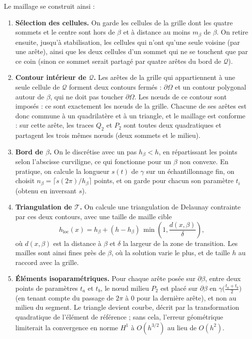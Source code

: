 \documentclass[11pt,a4paper]{article}
\begin{document}
Le maillage se construit ainsi :
\begin{enumerate}
  \item \textbf{Sélection des cellules.} On garde les cellules de la grille
        dont les quatre sommets et le centre sont hors de $\beta$ et à
        distance au moins $m_\beta$ de $\beta$. On retire ensuite, jusqu'à
        stabilisation, les cellules qui n'ont qu'une seule voisine (par une
        arête), ainsi que les deux cellules d'un sommet qui ne se touchent
        que par ce coin (sinon ce sommet serait partagé par quatre arêtes du
        bord de $\mathcal{Q}$).
  \item \textbf{Contour intérieur de $\mathcal{Q}$.} Les arêtes de la grille
        qui appartiennent à une seule cellule de $\mathcal{Q}$ forment deux contours fermés :
        $\partial\Omega$ et un contour polygonal autour de $\beta$, qui ne doit
        pas toucher $\partial\Omega$. Les nœuds de ce contour sont imposés :
        ce sont exactement les nœuds de la grille. Chacune de ses arêtes est
        donc commune à un quadrilatère et à un triangle, et le maillage est
        conforme : sur cette arête, les traces $Q_2$ et $P_2$ sont toutes deux
        quadratiques et partagent les trois mêmes nœuds (deux sommets et le
        milieu).
  \item \textbf{Bord de $\beta$.} On le discrétise avec un pas $h_\beta < h$,
        en répartissant les points selon l'abscisse curviligne, ce qui
        fonctionne pour un $\beta$ non convexe. En pratique, on calcule
        la longueur $s(t)$ de $\gamma$ sur un échantillonnage fin, on
        choisit $n_\beta = \lceil s(2\pi)/h_\beta \rceil$ points, et on
        garde pour chacun son paramètre $t_i$ (obtenu en inversant $s$).
  \item \textbf{Triangulation de $\mathcal{T}$.} On calcule une triangulation
        de Delaunay contrainte par ces deux contours, avec une taille de
        maille cible
        \[
        h_{\mathrm{loc}}(x) = h_\beta + (h - h_\beta)\,\min\!\left(1, \frac{d(x,\beta)}{\delta}\right),
        \]
        où $d(x,\beta)$ est la distance à $\beta$ et $\delta$ la largeur de
        la zone de transition. Les mailles sont ainsi fines près de $\beta$,
        où la solution varie le plus, et de taille $h$ au raccord avec la
        grille.
  \item \textbf{Éléments isoparamétriques.} Pour chaque arête posée sur
        $\partial\beta$, entre deux points de paramètres $t_a$ et $t_b$, le
        nœud milieu $P_2$ est placé sur $\partial\beta$ en
        $\gamma\big(\tfrac{t_a + t_b}{2}\big)$ (en tenant compte du passage
        de $2\pi$ à $0$ pour la dernière arête), et non au milieu du
        segment. Le triangle devient courbe, décrit par la
        transformation quadratique de l'élément de référence ; sans cela,
        l'erreur géométrique limiterait la convergence en norme $H^1$ à
        $O(h^{3/2})$ au lieu de $O(h^2)$.
\end{enumerate}
\end{document}
